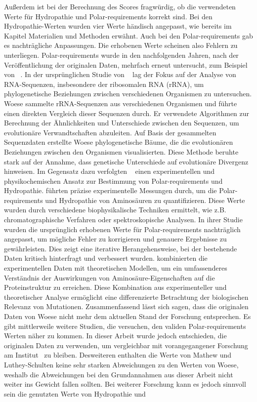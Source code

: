 \documentclass[german,version-2022-01]{uzl-thesis}
\begin{document}
Au\ss{}erdem ist bei der Berechnung des Scores fragw\"urdig, ob die verwendeten Werte f\"ur Hydropathie und Polar-requirements korrekt sind. Bei den Hydropathie-Werten wurden vier Werte h\"andisch angepasst, wie bereits im Kapitel Materialien und Methoden erw\"ahnt. Auch bei den Polar-requirements gab es nachtr\"agliche Anpassungen. Die erhobenen Werte scheinen also Fehlern zu unterliegen. Polar-requirements wurde in den nachfolgenden Jahren, nach der Ver\"offentlichung der originalen Daten, mehrfach erneut untersucht, zum Beispiel von \citeauthor{mathew_physical_2008}~\cite{mathew_physical_2008}. In der urspr\"unglichen Studie von \citeauthor{woese_fundamental_1966}~\cite{woese_fundamental_1966} lag der Fokus auf der Analyse von RNA-Sequenzen, insbesondere der ribosomalen RNA (rRNA), um phylogenetische Beziehungen zwischen verschiedenen Organismen zu untersuchen. Woese sammelte rRNA-Sequenzen aus verschiedenen Organismen und f\"uhrte einen direkten Vergleich dieser Sequenzen durch. Er verwendete Algorithmen zur Berechnung der \"Ahnlichkeiten und Unterschiede zwischen den Sequenzen, um evolution\"are Verwandtschaften abzuleiten. Auf Basis der gesammelten Sequenzdaten erstellte Woese phylogenetische B\"aume, die die evolution\"aren Beziehungen zwischen den Organismen visualisierten. Diese Methode beruhte stark auf der Annahme, dass genetische Unterschiede auf evolution\"are Divergenz hinweisen. Im Gegensatz dazu verfolgten \citeauthor{mathew_physical_2008}~\cite{mathew_physical_2008} einen experimentellen und physikochemischen Ansatz zur Bestimmung von Polar-requirements und Hydropathie. \citeauthor{mathew_physical_2008} f\"uhrten pr\"azise experimentelle Messungen durch, um die Polar-requirements und Hydropathie von Aminos\"auren zu quantifizieren. Diese Werte wurden durch verschiedene biophysikalische Techniken ermittelt, wie z.B. chromatographische Verfahren oder spektroskopische Analysen. In ihrer Studie wurden die urspr\"unglich erhobenen Werte f\"ur Polar-requirements nachtr\"aglich angepasst, um m\"ogliche Fehler zu korrigieren und genauere Ergebnisse zu gew\"ahrleisten. Dies zeigt eine iterative Herangehensweise, bei der bestehende Daten kritisch hinterfragt und verbessert wurden. \citeauthor{mathew_physical_2008} kombinierten die experimentellen Daten mit theoretischen Modellen, um ein umfassenderes Verst\"andnis der Auswirkungen von Aminos\"aure-Eigenschaften auf die Proteinstruktur zu erreichen. Diese Kombination aus experimenteller und theoretischer Analyse erm\"oglicht eine differenzierte Betrachtung der biologischen Relevanz von Mutationen. Zusammenfassend l\"asst sich sagen, dass die originalen Daten von Woese nicht mehr dem aktuellen Stand der Forschung entsprechen. Es gibt mittlerweile weitere Studien, die versuchen, den validen Polar-requirements Werten n\"aher zu kommen. In dieser Arbeit wurde jedoch entschieden, die originalen Daten zu verwenden, um vergleichbar mit vorangegangener Forschung am Institut~\cite{nina} zu bleiben. Desweiteren enthalten die Werte von Mathew und Luthey-Schulten keine sehr starken Abweichungen zu den Werten von Woese, weshalb die Abweichungen bei den Grundannahmen aus dieser Arbeit nicht weiter ins Gewicht fallen sollten. Bei weiterer Forschung kann es jedoch sinnvoll sein die genutzten Werte von Hydropathie und 
\end{document}
